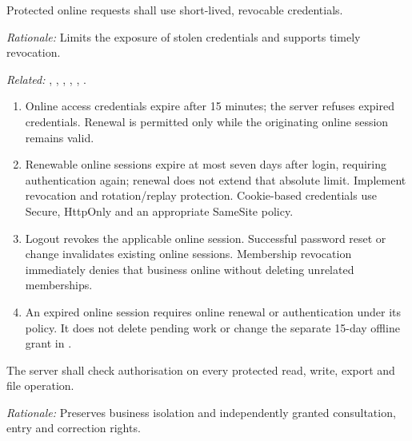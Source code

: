 \label{nfr:SEC-02}
Protected online requests shall use short-lived, revocable credentials.

\textit{Rationale:} Limits the exposure of stolen credentials and supports timely revocation.

\textit{Related:} \hyperref[fr:002]{}, \hyperref[fr:003]{}, \hyperref[fr:004]{}, \hyperref[fr:005]{}, \hyperref[fr:008]{}, \hyperref[fr:064]{}.
\begin{enumerate}[label=(\alph*),leftmargin=*,itemsep=1pt,topsep=3pt]
\item Online access credentials expire after 15 minutes; the server refuses expired credentials. Renewal is permitted only while the originating online session remains valid.
\item Renewable online sessions expire at most seven days after login, requiring authentication again; renewal does not extend that absolute limit. Implement revocation and rotation/replay protection. Cookie-based credentials use Secure, HttpOnly and an appropriate SameSite policy.
\item Logout revokes the applicable online session. Successful password reset or change invalidates existing online sessions. Membership revocation immediately denies that business online without deleting unrelated memberships.
\item An expired online session requires online renewal or authentication under its policy. It does not delete pending work or change the separate 15-day offline grant in \hyperref[nfr:AOC-02]{}.
\end{enumerate}

\label{nfr:SEC-03}
The server shall check authorisation on every protected read, write, export and file operation.

\textit{Rationale:} Preserves business isolation and independently granted consultation, entry and correction rights.

